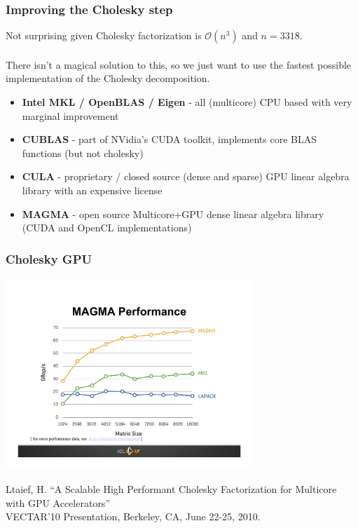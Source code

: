 \documentclass[slidestop,mathserif]{beamer}
\begin{document}

\begin{frame}
\frametitle{Improving the Cholesky step}

Not surprising given Cholesky factorization is $\mathcal{O}(n^3)$ and $n=3318$.\\
~\\
There isn't a magical solution to this, so we just want to use the fastest possible implementation of the Cholesky decomposition.

\begin{itemize}
\item \textbf{Intel MKL / OpenBLAS / Eigen} - all (multicore) CPU based with very marginal improvement 
\item \textbf{CUBLAS} - part of NVidia's CUDA toolkit, implements core BLAS functions (but not cholesky) 
\item \textbf{CULA} - proprietary / closed source (dense and sparse) GPU linear algebra library with an expensive license
\item \textbf{MAGMA} - open source Multicore+GPU dense linear algebra library (CUDA and OpenCL implementations)
\end{itemize}

\end{frame}


\begin{frame}
\frametitle{Cholesky GPU}

\vfill
\begin{center}
\includegraphics[width=0.7\textwidth]{pics/magma_chol.pdf}
\end{center}
\vfill
{\tiny Ltaief, H. ``A Scalable High Performant Cholesky Factorization for Multicore with GPU Accelerators''\\ VECTAR'10 Presentation, Berkeley, CA, June 22-25, 2010.}
\end{frame}
\end{document}
